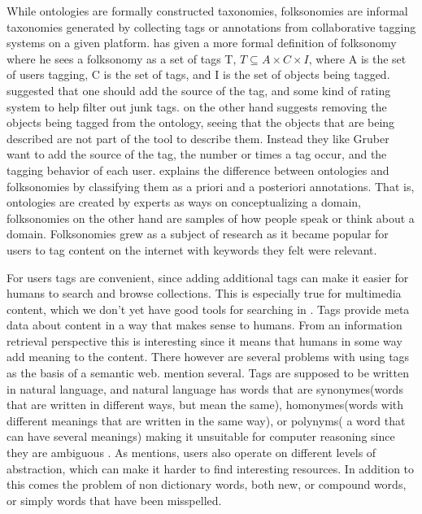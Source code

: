 While ontologies are formally constructed taxonomies, folksonomies are informal taxonomies generated by collecting tags or annotations from collaborative tagging systems on a given platform\citep{Tang2009}. 
\citet{Mika2005} has given a more formal definition of folksonomy where he sees a folksonomy as a set of tags T, 
$T \subseteq A \times C \times I$, where A is the set of users tagging, C is the set of tags, and I is the set of objects being tagged.
\citet{Gruber2007} suggested that one should add the source of the tag, and some kind of rating system to help filter out junk tags. 
\citet{Scerri2008} on the other hand suggests removing the objects being tagged from the ontology, 
seeing that the objects that are being described are not part of the tool to describe them.
Instead they like Gruber want to add the source of the tag, the number or times a tag occur, and the tagging behavior of each user.
\citet{Bang2008} explains the difference between ontologies and folksonomies by classifying them as a priori and a posteriori annotations. 
That is, ontologies are created by experts as ways on conceptualizing a domain, folksonomies on the other hand are samples of how people speak or think about a domain.
Folksonomies grew as a subject of research as it became popular for users to tag content on the internet with keywords they felt were relevant.

For users tags are convenient, since adding additional tags can make it easier for humans to search and browse collections. 
This is especially true for multimedia content, which we don't yet have good tools for searching in \citep{Weinberger2008}.
Tags provide meta data about content in a way that makes sense to humans. 
From an information retrieval perspective this is interesting since it means that humans in some way add meaning to the content.
There however are several problems with using tags as the basis of a semantic web. \citet{Tang2009} mention several. 
Tags are supposed to be written in natural language, and natural language has words that are synonymes(words that are written in different ways, 
but mean the same), homonymes(words with different meanings that are written in the same way), or polynyms( a word that can have several meanings) 
making it unsuitable for computer reasoning since they are ambiguous \citep{Passant2008}. 
As \citet{Golder2005} mentions, users also operate on different levels of abstraction, which can make it harder to find interesting resources.
In addition to this comes the problem of non dictionary words, both new, or compound words, or simply words that have been misspelled\citep{Tonkin2006}.



